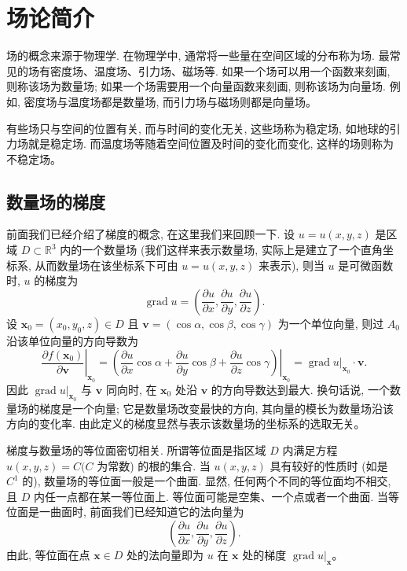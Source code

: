 \documentclass[UTF8,12pt,a4paper,fontset=fandol]{ctexart}
\begin{document}
\section{场论简介}

场的概念来源于物理学. 在物理学中, 通常将一些量在空间区域的分布称为场. 最常见的场有密度场、温度场、引力场、磁场等. 如果一个场可以用一个函数来刻画, 则称该场为数量场; 如果一个场需要用一个向量函数来刻画, 则称该场为向量场. 例如, 密度场与温度场都是数量场, 而引力场与磁场则都是向量场。

有些场只与空间的位置有关, 而与时间的变化无关, 这些场称为稳定场, 如地球的引力场就是稳定场. 而温度场等随着空间位置及时间的变化而变化, 这样的场则称为不稳定场。

\subsection{数量场的梯度}

前面我们已经介绍了梯度的概念, 在这里我们来回顾一下. 设 $u=u(x,y,z)$ 是区域 $D\subset\mathbb R^3$ 内的一个数量场 (我们这样来表示数量场, 实际上是建立了一个直角坐标系, 从而数量场在该坐标系下可由 $u=u(x,y,z)$ 来表示), 则当 $u$ 是可微函数时, $u$ 的梯度为
\[
  \operatorname{grad}u=
  \left(\frac{\partial u}{\partial x},\frac{\partial u}{\partial y},\frac{\partial u}{\partial z}\right).
\]
设 $\boldsymbol x_0=(x_0,y_0,z)\in D$ 且 $\boldsymbol v=(\cos\alpha,\cos\beta,\cos\gamma)$ 为一个单位向量, 则过 $A_0$ 沿该单位向量的方向导数为
\[
  \left.\frac{\partial f(\boldsymbol x_0)}{\partial\boldsymbol v}\right|_{\boldsymbol x_0}
  =
  \left.\left(\frac{\partial u}{\partial x}\cos\alpha+\frac{\partial u}{\partial y}\cos\beta+\frac{\partial u}{\partial z}\cos\gamma\right)\right|_{\boldsymbol x_0}
  =
  \left.\operatorname{grad}u\right|_{\boldsymbol x_0}\cdot\boldsymbol v.
\]
因此 $\left.\operatorname{grad}u\right|_{\boldsymbol x_0}$ 与 $\boldsymbol v$ 同向时, 在 $\boldsymbol x_0$ 处沿 $\boldsymbol v$ 的方向导数达到最大. 换句话说, 一个数量场的梯度是一个向量; 它是数量场改变最快的方向, 其向量的模长为数量场沿该方向的变化率. 由此定义的梯度显然与表示该数量场的坐标系的选取无关。

梯度与数量场的等位面密切相关. 所谓等位面是指区域 $D$ 内满足方程 $u(x,y,z)=C(C$ 为常数) 的根的集合. 当 $u(x,y,z)$ 具有较好的性质时 (如是 $C^1$ 的), 数量场的等位面一般是一个曲面. 显然, 任何两个不同的等位面均不相交, 且 $D$ 内任一点都在某一等位面上. 等位面可能是空集、一个点或者一个曲面. 当等位面是一曲面时, 前面我们已经知道它的法向量为
\[
  \left(\frac{\partial u}{\partial x},\frac{\partial u}{\partial y},\frac{\partial u}{\partial z}\right).
\]
由此, 等位面在点 $\boldsymbol x\in D$ 处的法向量即为 $u$ 在 $\boldsymbol x$ 处的梯度 $\left.\operatorname{grad}u\right|_{\boldsymbol x}$。
\end{document}
